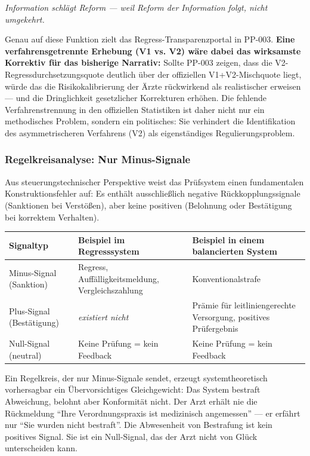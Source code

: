 \documentclass{umbruch-position}
\begin{document}
\textit{Information schlägt Reform — weil Reform der Information folgt, nicht umgekehrt.}

Genau auf diese Funktion zielt das Regress-Transparenzportal in PP-003. \textbf{Eine verfahrensgetrennte Erhebung (V1 vs. V2) wäre dabei das wirksamste Korrektiv für das bisherige Narrativ:} Sollte PP-003 zeigen, dass die V2-Regressdurchsetzungsquote deutlich über der offiziellen V1+V2-Mischquote liegt, würde das die Risikokalibrierung der Ärzte rückwirkend als realistischer erweisen --- und die Dringlichkeit gesetzlicher Korrekturen erhöhen. Die fehlende Verfahrenstrennung in den offiziellen Statistiken ist daher nicht nur ein methodisches Problem, sondern ein politisches: Sie verhindert die Identifikation des asymmetrischeren Verfahrens (V2) als eigenständiges Regulierungsproblem.

\subsubsection{Regelkreisanalyse: Nur Minus-Signale}

Aus steuerungstechnischer Perspektive weist das Prüfsystem einen fundamentalen Konstruktionsfehler auf: Es enthält ausschließlich negative Rückkopplungssignale (Sanktionen bei Verstößen), aber keine positiven (Belohnung oder Bestätigung bei korrektem Verhalten).

{\small
\begin{tabularx}{\textwidth}{l X X}
\toprule
\textbf{Signaltyp} & \textbf{Beispiel im Regresssystem} & \textbf{Beispiel in einem balancierten System} \\
\midrule
Minus-Signal (Sanktion) & Regress, Auffälligkeitsmeldung, Vergleichszahlung & Konventionalstrafe \\
Plus-Signal (Bestätigung) & \textit{existiert nicht} & Prämie für leitliniengerechte Versorgung, positives Prüfergebnis \\
Null-Signal (neutral) & Keine Prüfung = kein Feedback & Keine Prüfung = kein Feedback \\
\bottomrule
\end{tabularx}
}

\noindent Ein Regelkreis, der nur Minus-Signale sendet, erzeugt systemtheoretisch vorhersagbar ein Über\-vorsichtiges Gleich\-gewicht: Das System bestraft Abweichung, belohnt aber Konformität nicht. Der Arzt erhält nie die Rückmeldung ``Ihre Verordnungspraxis ist medizinisch angemessen'' --- er erfährt nur ``Sie wurden nicht bestraft''. Die Abwesenheit von Bestrafung ist kein positives Signal. Sie ist ein Null-Signal, das der Arzt nicht von Glück unterscheiden kann.
\end{document}
